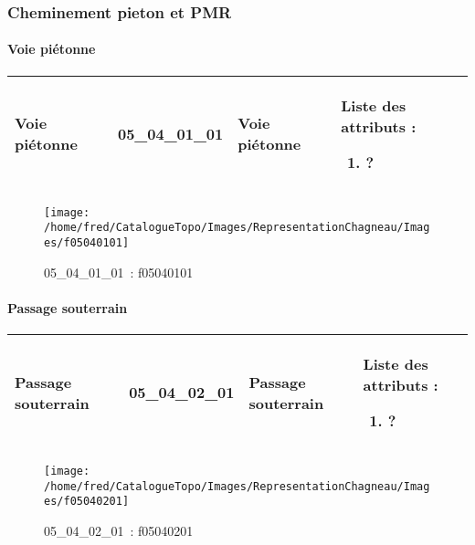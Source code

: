 \documentclass[12pt,titlepage]{book}
\begin{document}
\subsubsection{\large Cheminement pieton et PMR}
\paragraph{Voie piétonne}
\noindent
\vspace{\baselineskip}

\renewcommand{\arraystretch}{1.2}
\begin{supertabular}{|p{10cm}|c|p{13cm}|p{12cm}|}
 Voie piétonne & 05\_04\_01\_01 & Voie piétonne & Liste des attributs :
\begin{enumerate}
  \item ?\end{enumerate}
\\
\hline
\end{supertabular}
\begin{figure}[h!]
  \hfill         %
  \begin{minipage}[t]{3cm}
    \begin{center}
      \texttt{[image: /home/fred/CatalogueTopo/Images/RepresentationChagneau/Images/f05040101]}
      \caption[~05\_04\_01\_01]{\small{05\_04\_01\_01~:} \tiny{f05040101}}\label{f05040101}
    \end{center}
  \end{minipage}
\end{figure}


\paragraph{Passage souterrain}
\noindent
\vspace{\baselineskip}

\renewcommand{\arraystretch}{1.2}
\begin{supertabular}{|p{10cm}|c|p{13cm}|p{12cm}|}
 Passage souterrain & 05\_04\_02\_01 & Passage souterrain & Liste des attributs :
\begin{enumerate}
  \item ?\end{enumerate}
\\
\hline
\end{supertabular}
\begin{figure}[h!]
  \hfill         %
  \begin{minipage}[t]{3cm}
    \begin{center}
      \texttt{[image: /home/fred/CatalogueTopo/Images/RepresentationChagneau/Images/f05040201]}
      \caption[~05\_04\_02\_01]{\small{05\_04\_02\_01~:} \tiny{f05040201}}\label{f05040201}
    \end{center}
  \end{minipage}
\end{figure}
\end{document}
